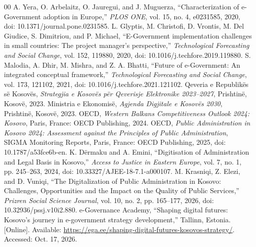\documentclass[conference]{IEEEtran}
\begin{document}
\begin{thebibliography}{00}
 A. Yera, O. Arbelaitz, O. Jauregui, and J. Muguerza, “Characterization of e-Government adoption in Europe,” \emph{PLOS ONE}, vol. 15, no. 4, e0231585, 2020, doi: 10.1371/journal.pone.0231585.
 L. Glyptis, M. Christofi, D. Vrontis, M. Del Giudice, S. Dimitriou, and P. Michael, “E-Government implementation challenges in small countries: The project manager’s perspective,” \emph{Technological Forecasting and Social Change}, vol. 152, 119880, 2020, doi: 10.1016/j.techfore.2019.119880.
 S. Malodia, A. Dhir, M. Mishra, and Z. A. Bhatti, “Future of e-Government: An integrated conceptual framework,” \emph{Technological Forecasting and Social Change}, vol. 173, 121102, 2021, doi: 10.1016/j.techfore.2021.121102.
 Qeveria e Republikës së Kosovës, \emph{Strategjia e Kosovës për Qeverisje Elektronike 2023–2027}, Prishtinë, Kosovë, 2023.
 Ministria e Ekonomisë, \emph{Agjenda Digjitale e Kosovës 2030}, Prishtinë, Kosovë, 2023.
 OECD, \emph{Western Balkans Competitiveness Outlook 2024: Kosovo}, Paris, France: OECD Publishing, 2024.
 OECD, \emph{Public Administration in Kosovo 2024: Assessment against the Principles of Public Administration}, SIGMA Monitoring Reports, Paris, France: OECD Publishing, 2025, doi: 10.1787/a53fce6b-en.
 K. Dërmaku and A. Emini, “Digitisation of Administration and Legal Basis in Kosovo,” \emph{Access to Justice in Eastern Europe}, vol. 7, no. 1, pp. 245–263, 2024, doi: 10.33327/AJEE-18-7.1-a000107.
 M. Krasniqi, Z. Elezi, and D. Vuniqi, “The Digitalization of Public Administration in Kosovo: Challenges, Opportunities and the Impact on the Quality of Public Services,” \emph{Prizren Social Science Journal}, vol. 10, no. 2, pp. 165–177, 2026, doi: 10.32936/pssj.v10i2.880.
 e-Governance Academy, “Shaping digital futures: Kosovo’s journey in e-government strategy development,” Tallinn, Estonia. [Online]. Available: \url{https://ega.ee/shaping-digital-futures-kosovos-strategy/}. Accessed: Oct. 17, 2026.
\end{thebibliography}
\end{document}
